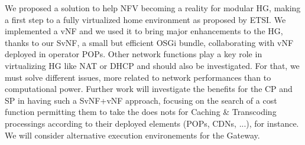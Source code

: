 We proposed a solution to help NFV becoming a reality for modular HG, making a first step to a fully virtualized home environment as proposed by ETSI.
We implemented a vNF and we used it to bring major enhancements to the HG, thanks to our SvNF, a small but efficient OSGi bundle, collaborating with vNF deployed in operator POPs.
Other network functions play a key role in virtualizing HG like NAT or DHCP and should also be investigated.
For that, we must solve different issues, more related to network performances than to computational power. 
Further work will investigate the benefits for the CP and SP in having such a SvNF+vNF approach, focusing on the search of a cost function permitting them to take the does nots for Caching \& Transcoding processings according to their deployed elements (POPs, CDNs, ...), for instance. 
We will consider alternative execution environements for the Gateway.


